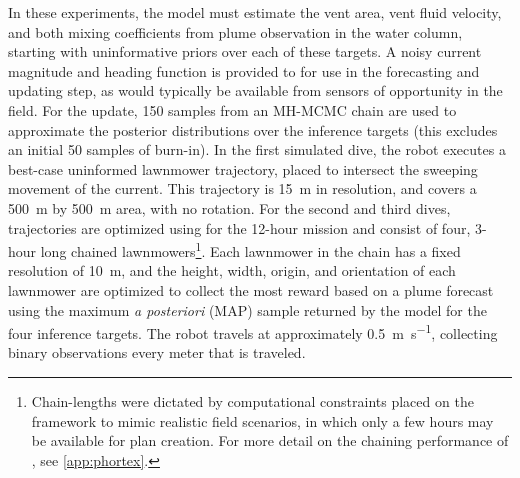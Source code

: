 In these experiments, the \PHUMES model must estimate the vent area, vent fluid velocity, and both mixing coefficients from plume observation in the water column, starting with uninformative priors over each of these targets. A noisy current magnitude and heading function is provided to \PHUMES for use in the forecasting and updating step, as would typically be available from sensors of opportunity in the field. For the \PHUMES update, 150 samples from an MH-MCMC chain are used to approximate the posterior distributions over the inference targets (this excludes an initial 50 samples of burn-in). In the first simulated dive, the robot executes a best-case uninformed lawnmower trajectory, placed to intersect the sweeping movement of the current. This trajectory is \SI{15}{\meter} in resolution, and covers a \SI{500}{\meter} by \SI{500}{\meter} area, with no rotation. For the second and third dives, trajectories are optimized using \PHORTEX for the 12-hour mission and consist of four, 3-hour long chained lawnmowers\footnote{Chain-lengths were dictated by computational constraints placed on the framework to mimic realistic field scenarios, in which only a few hours may be available for plan creation. For more detail on the chaining performance of \PHUMES, see \cref{app:phortex}.}. Each lawnmower in the chain has a fixed resolution of \SI{10}{\meter}, and the height, width, origin, and orientation of each lawnmower are optimized to collect the most reward based on a plume forecast using the maximum \emph{a posteriori} (MAP) sample returned by the \PHUMES model for the four inference targets. The robot travels at approximately \SI{0.5}{\meter\per\second}, collecting binary observations every meter that is traveled.

